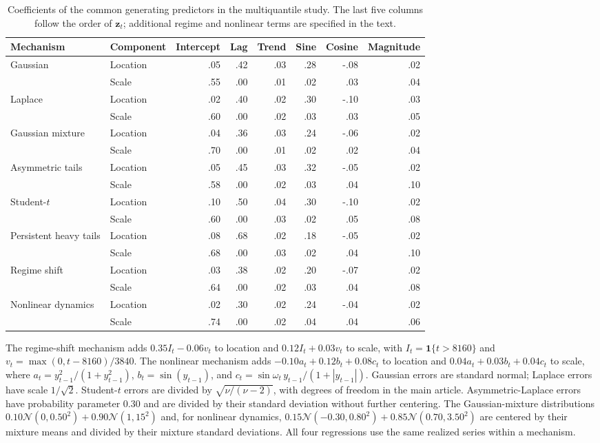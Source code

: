 \documentclass[12pt,letterpaper]{article}
\newcommand{\vect}[1]{\bm{#1}}
\newcommand{\ind}{\mathbf{1}}
\newcommand{\Normal}{\mathcal{N}}
\numberwithin{suppalgorithm}{section}
\numberwithin{equation}{section}
\numberwithin{table}{section}
\numberwithin{figure}{section}
\begin{document}
\begin{table}[!htbp]
\centering
\small
\setlength{\tabcolsep}{4pt}
\begin{tabular}{@{}llrrrrrr@{}}
\toprule
Mechanism & Component & Intercept & Lag & Trend & Sine & Cosine & Magnitude \\
\midrule
Gaussian & Location & .05 & .42 & .03 & .28 & -.08 & .02 \\
 & Scale & .55 & .00 & .01 & .02 & .03 & .04 \\
Laplace & Location & .02 & .40 & .02 & .30 & -.10 & .03 \\
 & Scale & .60 & .00 & .02 & .03 & .03 & .05 \\
Gaussian mixture & Location & .04 & .36 & .03 & .24 & -.06 & .02 \\
 & Scale & .70 & .00 & .01 & .02 & .02 & .04 \\
Asymmetric tails & Location & .05 & .45 & .03 & .32 & -.05 & .02 \\
 & Scale & .58 & .00 & .02 & .03 & .04 & .10 \\
Student-\(t\) & Location & .10 & .50 & .04 & .30 & -.10 & .02 \\
 & Scale & .60 & .00 & .03 & .02 & .05 & .08 \\
Persistent heavy tails & Location & .08 & .68 & .02 & .18 & -.05 & .02 \\
 & Scale & .68 & .00 & .03 & .02 & .04 & .10 \\
Regime shift & Location & .03 & .38 & .02 & .20 & -.07 & .02 \\
 & Scale & .64 & .00 & .02 & .03 & .04 & .08 \\
Nonlinear dynamics & Location & .02 & .30 & .02 & .24 & -.04 & .02 \\
 & Scale & .74 & .00 & .02 & .04 & .04 & .06 \\
\bottomrule
\end{tabular}
\caption{Coefficients of the common generating predictors in the
multiquantile study. The last five columns follow the order of
\(\vect z_t\); additional regime and nonlinear terms are specified in
the text.}
\label{tab:supp-mq-generating-coefficients}
\end{table}

The regime-shift mechanism adds \(0.35I_t-0.06v_t\) to location and
\(0.12I_t+0.03v_t\) to scale, with \(I_t=\ind\{t>8160\}\) and
\(v_t=\max(0,t-8160)/3840\). The nonlinear mechanism adds
\(-0.10a_t+0.12b_t+0.08c_t\) to location and
\(0.04a_t+0.03b_t+0.04c_t\) to scale, where
\(a_t=y_{t-1}^2/(1+y_{t-1}^2)\), \(b_t=\sin(y_{t-1})\), and
\(c_t=\sin\omega_t\,y_{t-1}/(1+|y_{t-1}|)\).
Gaussian errors are standard normal; Laplace errors have scale
\(1/\sqrt{2}\). Student-\(t\) errors are divided by
\(\sqrt{\nu/(\nu-2)}\), with degrees of freedom in the main article.
Asymmetric-Laplace errors have probability parameter 0.30 and are divided
by their standard deviation without further centering.
The Gaussian-mixture distributions
\(0.10\Normal(0,0.50^2)+0.90\Normal(1,15^2)\) and, for nonlinear
dynamics, \(0.15\Normal(-0.30,0.80^2)+0.85\Normal(0.70,3.50^2)\)
are centered by their mixture means and divided by their mixture standard
deviations. All four regressions use the same realized series within a
mechanism.
\end{document}
